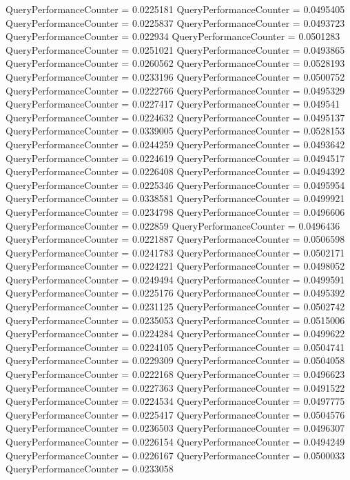 \documentclass[9pt]{article}
\theoremstyle{plain}
\theoremstyle{definition}
\theoremstyle{remark}
\numberwithin{equation}{section}
\begin{document}
QueryPerformanceCounter  =  0.0225181
QueryPerformanceCounter  =  0.0495405
QueryPerformanceCounter  =  0.0225837
QueryPerformanceCounter  =  0.0493723
QueryPerformanceCounter  =  0.022934
QueryPerformanceCounter  =  0.0501283
QueryPerformanceCounter  =  0.0251021
QueryPerformanceCounter  =  0.0493865
QueryPerformanceCounter  =  0.0260562
QueryPerformanceCounter  =  0.0528193
QueryPerformanceCounter  =  0.0233196
QueryPerformanceCounter  =  0.0500752
QueryPerformanceCounter  =  0.0222766
QueryPerformanceCounter  =  0.0495329
QueryPerformanceCounter  =  0.0227417
QueryPerformanceCounter  =  0.049541
QueryPerformanceCounter  =  0.0224632
QueryPerformanceCounter  =  0.0495137
QueryPerformanceCounter  =  0.0339005
QueryPerformanceCounter  =  0.0528153
QueryPerformanceCounter  =  0.0244259
QueryPerformanceCounter  =  0.0493642
QueryPerformanceCounter  =  0.0224619
QueryPerformanceCounter  =  0.0494517
QueryPerformanceCounter  =  0.0226408
QueryPerformanceCounter  =  0.0494392
QueryPerformanceCounter  =  0.0225346
QueryPerformanceCounter  =  0.0495954
QueryPerformanceCounter  =  0.0338581
QueryPerformanceCounter  =  0.0499921
QueryPerformanceCounter  =  0.0234798
QueryPerformanceCounter  =  0.0496606
QueryPerformanceCounter  =  0.022859
QueryPerformanceCounter  =  0.0496436
QueryPerformanceCounter  =  0.0221887
QueryPerformanceCounter  =  0.0506598
QueryPerformanceCounter  =  0.0241783
QueryPerformanceCounter  =  0.0502171
QueryPerformanceCounter  =  0.0224221
QueryPerformanceCounter  =  0.0498052
QueryPerformanceCounter  =  0.0249494
QueryPerformanceCounter  =  0.0499591
QueryPerformanceCounter  =  0.0225176
QueryPerformanceCounter  =  0.0495392
QueryPerformanceCounter  =  0.0231125
QueryPerformanceCounter  =  0.0502742
QueryPerformanceCounter  =  0.0235053
QueryPerformanceCounter  =  0.0515006
QueryPerformanceCounter  =  0.0224284
QueryPerformanceCounter  =  0.0499622
QueryPerformanceCounter  =  0.0224105
QueryPerformanceCounter  =  0.0504741
QueryPerformanceCounter  =  0.0229309
QueryPerformanceCounter  =  0.0504058
QueryPerformanceCounter  =  0.0222168
QueryPerformanceCounter  =  0.0496623
QueryPerformanceCounter  =  0.0227363
QueryPerformanceCounter  =  0.0491522
QueryPerformanceCounter  =  0.0224534
QueryPerformanceCounter  =  0.0497775
QueryPerformanceCounter  =  0.0225417
QueryPerformanceCounter  =  0.0504576
QueryPerformanceCounter  =  0.0236503
QueryPerformanceCounter  =  0.0496307
QueryPerformanceCounter  =  0.0226154
QueryPerformanceCounter  =  0.0494249
QueryPerformanceCounter  =  0.0226167
QueryPerformanceCounter  =  0.0500033
QueryPerformanceCounter  =  0.0233058
\end{document}

